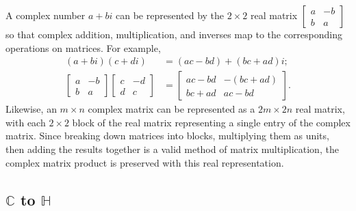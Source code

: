 \documentclass{article}
\begin{document}
A complex number $a+bi$ can be represented by the $2 \times 2$ real matrix
$\begin{bmatrix} a & -b \\ b & a \end{bmatrix}$
so that complex addition, multiplication, and inverses
map to the corresponding operations on matrices.
For example,
\begin{align*}
  (a+bi) (c+di) &= (ac-bd)+(bc+ad)i; \\
  \begin{bmatrix} a & -b \\ b & a \end{bmatrix}
  \begin{bmatrix} c & -d \\ d & c \end{bmatrix} &=
  \begin{bmatrix} ac-bd & -(bc+ad) \\ bc+ad & ac-bd \end{bmatrix}.
\end{align*}
Likewise, an $m \times n$ complex matrix can be represented as a $2m \times 2n$ real matrix,
with each $2 \times 2$ block of the real matrix representing a single entry of the complex matrix.
Since breaking down matrices into blocks, multiplying them as units,
then adding the results together is a valid method of matrix multiplication,
the complex matrix product is preserved with this real representation.

\subsection{\texorpdfstring{$\mathbb{C}$}{C} to \texorpdfstring{$\mathbb{H}$}{H}}
\end{document}

